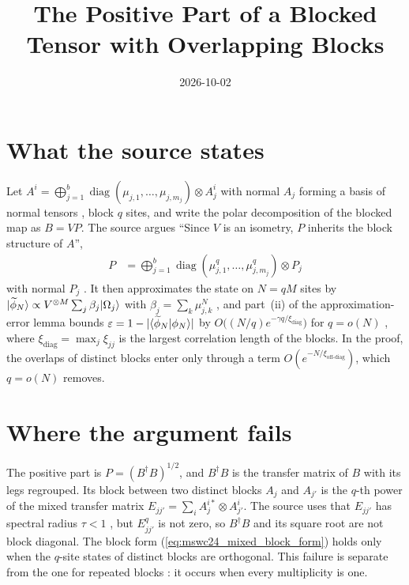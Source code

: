\documentclass{article}
\title{The Positive Part of a Blocked Tensor with Overlapping Blocks}
\author{}
\date{2026-10-02}
\begin{document}
\maketitle
{}

\section{What the source states}
Let $A^i=\bigoplus_{j=1}^b\operatorname{diag}(\mu_{j,1},\dots,\mu_{j,m_j})
    \otimes A_j^i$ with normal $A_j$ forming a basis of normal tensors
\cite[eq.~(S2)]{Malz2024Preparation}, block $q$ sites, and write the polar
decomposition of the blocked map as $B=VP$. The source argues ``Since $V$ is
an isometry, $P$ inherits the block structure of $A$'',
\begin{align}
    P & =\bigoplus_{j=1}^b\operatorname{diag}(\mu_{j,1}^q,\dots,\mu_{j,m_j}^q)
    \otimes P_j
    \label{eq:mswc24_mixed_block_form}
\end{align}
with normal $P_j$ \cite[eq.~(S5)]{Malz2024Preparation}. It then approximates the
state on $N=qM$ sites by
$|\widetilde\phi_N\rangle\propto V^{\otimes M}\sum_j\beta_j|\Omega_j\rangle$ with
$\beta_j=\sum_k\mu_{j,k}^N$ \cite[eq.~(S7)]{Malz2024Preparation}, and part~(ii)
of the approximation-error lemma bounds
$\varepsilon=1-\lvert\langle \widetilde\phi_N | \phi_N \rangle\rvert$ by
$O\bigl((N/q)e^{-\gamma q/\xi_{\mathrm{diag}}}\bigr)$ for $q=o(N)$
\cite[eq.~(S12)]{Malz2024Preparation}, where
$\xi_{\mathrm{diag}}=\max_j\xi_{jj}$ is the largest correlation length of the
blocks. In the proof, the overlaps of distinct blocks enter only through a
term $O(e^{-N/\xi_{\mathrm{off\text{-}diag}}})$, which $q=o(N)$ removes.

\section{Where the argument fails}
The positive part is $P=(B^\dagger B)^{1/2}$, and $B^\dagger B$ is the transfer
matrix of $B$ with its legs regrouped. Its block between two distinct blocks
$A_j$ and $A_{j'}$ is the $q$-th power of the mixed transfer matrix
$E_{jj'}=\sum_iA_j^{i*}\otimes A_{j'}^i$. The source uses that
$E_{jj'}$ has spectral radius $\tau<1$ \cite[proof of Lemma~1$'$]{Malz2024Preparation},
but $E_{jj'}^q$ is not zero, so $B^\dagger B$ and its square root are not block
diagonal. The block form (\ref{eq:mswc24_mixed_block_form}) holds only when the
$q$-site states of distinct blocks are orthogonal. This failure is separate from
the one for repeated blocks \cite{gap:mswc24_multiplicity_fixed_point}: it occurs
when every multiplicity is one.
\end{document}
